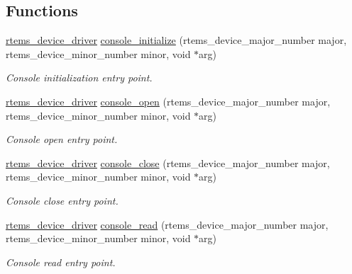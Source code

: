 \subsection*{Functions}
\begin{DoxyCompactItemize}
\item 
\mbox{\hyperlink{group__ClassicStatus_ga545d41846817eaba6143d52ee4d9e9fe}{rtems\+\_\+device\+\_\+driver}} \mbox{\hyperlink{mpc55xxevb_2console_2console-generic_8c_aafa42e88bcc94ce0f507f77be54a90a6}{console\+\_\+initialize}} (rtems\+\_\+device\+\_\+major\+\_\+number major, rtems\+\_\+device\+\_\+minor\+\_\+number minor, void $\ast$arg)
\begin{DoxyCompactList}\small\item\em Console initialization entry point. \end{DoxyCompactList}\item 
\mbox{\hyperlink{group__ClassicStatus_ga545d41846817eaba6143d52ee4d9e9fe}{rtems\+\_\+device\+\_\+driver}} \mbox{\hyperlink{mpc55xxevb_2console_2console-generic_8c_a3f4320ff384009c3bdfa6ec4f1b79501}{console\+\_\+open}} (rtems\+\_\+device\+\_\+major\+\_\+number major, rtems\+\_\+device\+\_\+minor\+\_\+number minor, void $\ast$arg)
\begin{DoxyCompactList}\small\item\em Console open entry point. \end{DoxyCompactList}\item 
\mbox{\hyperlink{group__ClassicStatus_ga545d41846817eaba6143d52ee4d9e9fe}{rtems\+\_\+device\+\_\+driver}} \mbox{\hyperlink{mpc55xxevb_2console_2console-generic_8c_a4efabb094608f8155b1a679e03f2eafc}{console\+\_\+close}} (rtems\+\_\+device\+\_\+major\+\_\+number major, rtems\+\_\+device\+\_\+minor\+\_\+number minor, void $\ast$arg)
\begin{DoxyCompactList}\small\item\em Console close entry point. \end{DoxyCompactList}\item 
\mbox{\hyperlink{group__ClassicStatus_ga545d41846817eaba6143d52ee4d9e9fe}{rtems\+\_\+device\+\_\+driver}} \mbox{\hyperlink{mpc55xxevb_2console_2console-generic_8c_affd7cbaa034887f37032640f39c74b0d}{console\+\_\+read}} (rtems\+\_\+device\+\_\+major\+\_\+number major, rtems\+\_\+device\+\_\+minor\+\_\+number minor, void $\ast$arg)
\begin{DoxyCompactList}\small\item\em Console read entry point. \end{DoxyCompactList}\item 

\end{DoxyCompactItemize}
